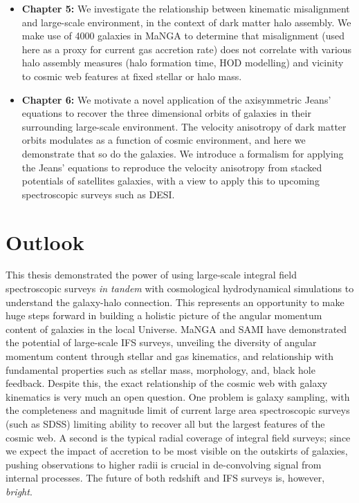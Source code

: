 \begin{itemize}
    \item \textbf{Chapter 5:} We investigate the relationship between kinematic misalignment and large-scale environment, in the context of dark matter halo assembly. We make use of 4000 galaxies in MaNGA to determine that misalignment (used here as a proxy for current gas accretion rate) does not correlate with various halo assembly measures (halo formation time, HOD modelling) and vicinity to cosmic web features at fixed stellar or halo mass. 
    
    \item \textbf{Chapter 6:} We motivate a novel application of the axisymmetric Jeans' equations to recover the three dimensional orbits of galaxies in their surrounding large-scale environment. The velocity anisotropy of dark matter orbits modulates as a function of cosmic environment, and here we demonstrate that so do the galaxies. We introduce a formalism for applying the Jeans' equations to reproduce the velocity anisotropy from stacked potentials of satellites galaxies, with a view to apply this to upcoming spectroscopic surveys such as DESI.
\end{itemize}

\section{Outlook}
This thesis demonstrated the power of using large-scale integral field spectroscopic surveys \textit{in tandem} with cosmological hydrodynamical simulations to understand the galaxy-halo connection. This represents an opportunity to make huge steps forward in building a holistic picture of the angular momentum content of galaxies in the local Universe. MaNGA and SAMI have demonstrated the potential of large-scale IFS surveys, unveiling the diversity of angular momentum content through stellar and gas kinematics, and relationship with fundamental properties such as stellar mass, morphology, and, black hole feedback. Despite this, the exact relationship of the cosmic web with galaxy kinematics is very much an open question. One problem is galaxy sampling, with the completeness and magnitude limit of current large area spectroscopic surveys (such as SDSS) limiting ability to recover all but the largest features of the cosmic web. A second is the typical radial coverage of integral field surveys; since we expect the impact of accretion to be most visible on the outskirts of galaxies, pushing observations to higher radii is crucial in de-convolving signal from internal processes. The future of both redshift and IFS surveys is, however, \textit{bright}.


